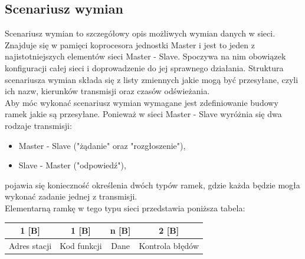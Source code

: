 \documentclass[a4paper,twoside]{article}
\begin{document}
\subsection{Scenariusz wymian}
Scenariusz wymian to szczegółowy opis możliwych wymian danych w sieci. Znajduje się w pamięci koprocesora jednostki Master i jest to jeden z najistotniejszych elementów sieci Master - Slave. Spoczywa na nim obowiązek konfiguracji całej sieci i doprowadzenie do jej sprawnego działania. Struktura scenariusza wymian składa się z listy zmiennych jakie mogą być przesyłane, czyli ich nazw, kierunków transmisji oraz czasów odświeżania.\\
Aby móc wykonać scenariusz wymian wymagane jest zdefiniowanie budowy ramek jakie są przesyłane. Ponieważ w sieci Master - Slave wyróżnia się dwa rodzaje transmisji:
\begin{itemize}
	\item Master - Slave ("żądanie" oraz "rozgłoszenie"), 
	\item Slave - Master ("odpowiedź"), 
\end{itemize}
pojawia się konieczność określenia dwóch typów ramek, gdzie każda będzie mogła wykonać zadanie jednej z transmisji.\\
Elementarną ramkę w tego typu sieci przedstawia poniższa tabela:
\begin{center}
	\begin{tabular}{cccc}
		1 [B] & 1 [B] & n [B] & 2 [B] \\ 
		\hline \multicolumn{1}{|c}{Adres stacji} & \multicolumn{1}{|c}{Kod funkcji} & \multicolumn{1}{|c}{Dane} & \multicolumn{1}{|c|}{Kontrola błędów} \\ 
		\hline 
	\end{tabular}
\end{center}
\end{document}
